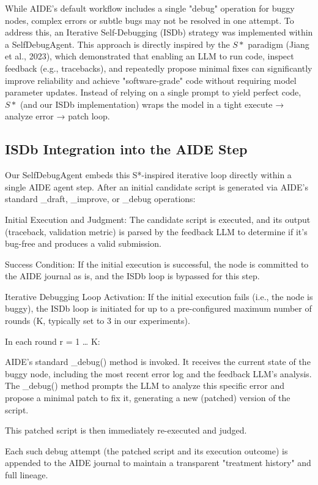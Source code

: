 While AIDE's default workflow includes a single "debug" operation for buggy nodes, complex errors or subtle bugs may not be resolved in one attempt. To address this, an Iterative Self-Debugging (ISDb) strategy was implemented within a SelfDebugAgent. This approach is directly inspired by the $S*$ paradigm (Jiang et al., 2023), which demonstrated that enabling an LLM to run code, inspect feedback (e.g., tracebacks), and repeatedly propose minimal fixes can significantly improve reliability and achieve "software-grade" code without requiring model parameter updates. Instead of relying on a single prompt to yield perfect code, $S*$ (and our ISDb implementation) wraps the model in a tight execute → analyze error → patch loop.

\subsection{ISDb Integration into the AIDE Step}
Our SelfDebugAgent embeds this S*-inspired iterative loop directly within a single AIDE agent step. After an initial candidate script is generated via AIDE's standard _draft, _improve, or _debug operations:

        Initial Execution and Judgment: The candidate script is executed, and its output (traceback, validation metric) is parsed by the feedback LLM to determine if it's bug-free and produces a valid submission.

        Success Condition: If the initial execution is successful, the node is committed to the AIDE journal as is, and the ISDb loop is bypassed for this step.

        Iterative Debugging Loop Activation: If the initial execution fails (i.e., the node is buggy), the ISDb loop is initiated for up to a pre-configured maximum number of rounds (K, typically set to 3 in our experiments).

            In each round r = 1 … K:

                AIDE's standard _debug() method is invoked. It receives the current state of the buggy node, including the most recent error log and the feedback LLM's analysis. The _debug() method prompts the LLM to analyze this specific error and propose a minimal patch to fix it, generating a new (patched) version of the script.

                This patched script is then immediately re-executed and judged.

                Each such debug attempt (the patched script and its execution outcome) is appended to the AIDE journal to maintain a transparent "treatment history" and full lineage.


